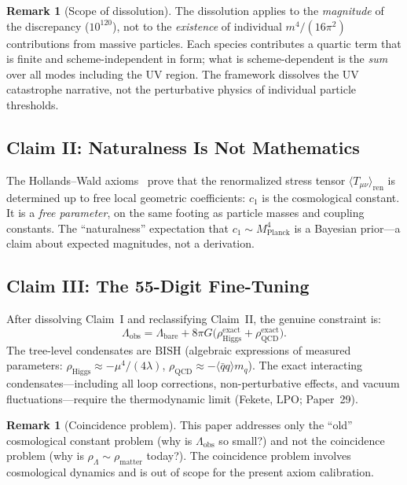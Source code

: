 \documentclass[11pt,a4paper]{article}
\theoremstyle{plain}
\theoremstyle{definition}
\newtheorem{remark}[theorem]{Remark}
\newcommand{\LPO}{\ensuremath{\mathrm{LPO}}}
\newcommand{\BISH}{\ensuremath{\mathrm{BISH}}}
\newcommand{\Lobs}{\Lambda_{\mathrm{obs}}}
\newcommand{\Lbare}{\Lambda_{\mathrm{bare}}}
\newcommand{\MPl}{M_{\mathrm{Planck}}}
\begin{document}
\begin{remark}[Scope of dissolution]
The dissolution applies to the \emph{magnitude} of the discrepancy
($10^{120}$), not to the \emph{existence} of individual $m^4/(16\pi^2)$
contributions from massive particles.  Each species contributes a
quartic term that is finite and scheme-independent in form;
what is scheme-dependent is the \emph{sum} over all modes including
the UV region.  The framework dissolves the UV catastrophe narrative,
not the perturbative physics of individual particle thresholds.
\end{remark}

\subsection{Claim II: Naturalness Is Not Mathematics}

The Hollands--Wald axioms~\cite{HollandsWald2001,HollandsWald2005}
prove that the renormalized stress tensor $\langle T_{\mu\nu}\rangle_{\mathrm{ren}}$
is determined up to free local geometric coefficients:
$c_1$ is the cosmological constant.  It is a \emph{free parameter},
on the same footing as particle masses and coupling constants.
The ``naturalness'' expectation that $c_1 \sim \MPl^4$ is a
Bayesian prior---a claim about expected magnitudes, not a derivation.

\subsection{Claim III: The 55-Digit Fine-Tuning}

After dissolving Claim~I and reclassifying Claim~II, the genuine
constraint is:
\[
  \Lobs = \Lbare + 8\pi G\bigl(\rho_{\mathrm{Higgs}}^{\mathrm{exact}}
    + \rho_{\mathrm{QCD}}^{\mathrm{exact}}\bigr).
\]
The tree-level condensates are $\BISH$ (algebraic expressions of measured
parameters: $\rho_{\mathrm{Higgs}} \approx -\mu^4/(4\lambda)$,
$\rho_{\mathrm{QCD}} \approx -\langle\bar{q}q\rangle m_q$).
The exact interacting condensates---including all loop corrections,
non-perturbative effects, and vacuum fluctuations---require the
thermodynamic limit (Fekete, $\LPO$; Paper~29).
\begin{remark}[Coincidence problem]
This paper addresses only the ``old'' cosmological constant
problem (why is $\Lobs$ so small?) and not the coincidence
problem (why is $\rho_\Lambda \sim \rho_{\mathrm{matter}}$
today?).  The coincidence problem involves cosmological dynamics
and is out of scope for the present axiom calibration.
\end{remark}
\end{document}
